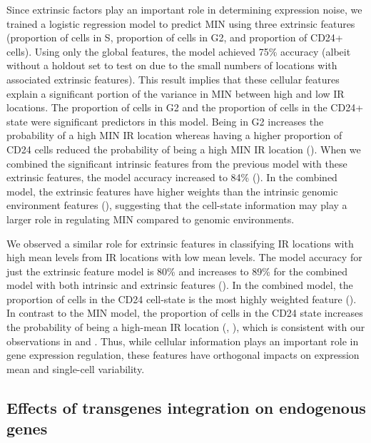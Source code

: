 Since extrinsic factors play an important role in determining expression noise, we trained a logistic regression model to predict MIN using three extrinsic features (proportion of cells in S, proportion of cells in G2, and proportion of CD24+ cells). Using only the global features, the model achieved 75\% accuracy (albeit without a holdout set to test on due to the small numbers of locations with associated extrinsic features). This result implies that these cellular features explain a significant portion of the variance in MIN between high and low IR locations. The proportion of cells in G2 and the proportion of cells in the CD24+ state were significant predictors in this model. Being in G2 increases the probability of a high MIN IR location whereas having a higher proportion of CD24 cells reduced the probability of being a high MIN IR location (). When we combined the significant intrinsic features from the previous model with these extrinsic features, the model accuracy increased to 84\% (). In the combined model, the extrinsic features have higher weights than the intrinsic genomic environment features (), suggesting that the cell-state information may play a larger role in regulating MIN compared to genomic environments. 

We observed a similar role for extrinsic features in classifying IR locations with high mean levels from IR locations with low mean levels. The model accuracy for just the extrinsic feature model is 80\% and increases to 89\% for the combined model with both intrinsic and extrinsic features (). In the combined model, the proportion of cells in the CD24 cell-state is the most highly weighted feature (). In contrast to the MIN model, the proportion of cells in the CD24 state increases the probability of being a high-mean IR location (, ), which is consistent with our observations in  and . Thus, while cellular information plays an important role in gene expression regulation, these features have orthogonal impacts on expression mean and single-cell variability. 

\subsection{Effects of transgenes integration on endogenous genes}

